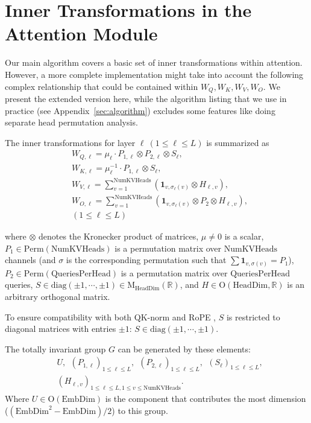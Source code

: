 \documentclass{article} %
\begin{document}
\section{Inner Transformations in the Attention Module}
\label{sec:inner_transformations_attention}

Our main algorithm covers a basic set of inner transformations within attention. However, a more complete implementation might take into account the following complex relationship that could be contained within $W_Q, W_K, W_V, W_O$. We present the extended version here, while the algorithm listing that we use in practice (see Appendix~\ref{sec:algorithm}) excludes some features like doing separate head permutation analysis.

The inner transformations for layer $\ell \ (1 \le \ell \le L)$ is summarized as
\[
\begin{aligned}
    &W_{Q,\ell} = \mu_\ell \cdot P_{1,\ell} \otimes P_{2,\ell} \otimes S_\ell, \quad \\
    &W_{K,\ell} = \mu^{-1}_\ell \cdot P_{1,\ell} \otimes S_\ell, \\
    &W_{V,\ell} = \sum_{v=1}^{\mathrm{NumKVHeads}} (\mathbf{1}_{v, \sigma_\ell(v)} \otimes H_{\ell,v}), \\
    &W_{O,\ell} = \sum_{v=1}^{\mathrm{NumKVHeads}} (\mathbf{1}_{v, \sigma_\ell(v)} \otimes P_2 \otimes H_{\ell,v}), \\ 
    &(1 \le \ell \le L)
\end{aligned}
\]

where $\otimes$ denotes the Kronecker product of matrices, $\mu \neq 0$ is a scalar, $P_1 \in \mathrm{Perm}(\mathrm{NumKVHeads})$ is a permutation matrix over $\mathrm{NumKVHeads}$ channels (and $\sigma$ is the corresponding permutation such that $\sum \mathbf{1}_{v, \sigma(v)} = P_1$),  
$P_2 \in \mathrm{Perm}(\mathrm{QueriesPerHead})$ is a permutation matrix over $\mathrm{QueriesPerHead}$ queries,  
$S \in \mathrm{diag}(\pm 1, \cdots, \pm 1) \in \mathrm{M}_{\mathrm{HeadDim}}(\mathbb{R})$, and $H \in \mathrm{O}(\mathrm{HeadDim}, \mathbb{R})$ is an arbitrary orthogonal matrix.

To ensure compatibility with both QK-norm \citep{henry2020querykeynormalizationtransformers} and RoPE \citep{su2023roformerenhancedtransformerrotary}, $S$ is restricted to diagonal matrices with entries $\pm 1$:  
$S \in \mathrm{diag}(\pm 1, \cdots, \pm 1).$


The totally invariant group $G$ can be generated by these elements:
\[ 
\begin{aligned}
&U, \ \ (P_{1,\ell})_{1 \le \ell \le L},\ \  (P_{2,\ell})_{1 \le \ell \le L},\ \  (S_{\ell})_{1 \le \ell \le L}, \\
&(H_{\ell,v})_{1 \le \ell \le L, 1\le v \le \mathrm{NumKVHeads}}.
\end{aligned}
\]
Where $U \in \mathrm{O}(\mathrm{EmbDim})$ is the component that contributes the most dimension ($(\mathrm{EmbDim}^2 - \mathrm{EmbDim})/2$) to this group.
\end{document}
